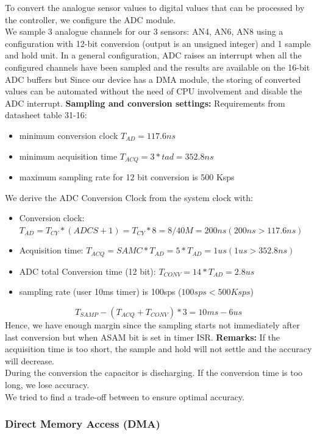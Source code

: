 To convert the analogue sensor values to digital values that can be processed by the controller, we configure the ADC module. \\
We sample 3 analogue channels for our 3 sensors: AN4, AN6, AN8 using a configuration with 12-bit conversion (output is an unsigned integer) and 1 sample and hold unit.
\vskip 0.1in
\noindent
In a general configuration, ADC raises an interrupt when all the configured channels have been sampled and the results are available on the 16-bit ADC buffers but Since our device has a DMA module, the storing of converted values can be automated without the need of CPU involvement and disable the ADC interrupt.
\vskip 0.1in
\noindent
\textbf{Sampling and conversion settings:}
\vskip 0.1in
\noindent
Requirements from datasheet table 31-16:
\begin{itemize}
    \item minimum conversion clock $T_{AD} = 117.6 ns$
    \item minimum acquisition time $T_{ACQ}=3*tad= 352.8ns $
    \item maximum sampling rate for 12 bit conversion is 500 Ksps
\end{itemize}
\vskip 0.1in
\noindent
We derive the ADC Conversion Clock from the system clock with:
\begin{itemize}
    \item Conversion clock: $T_{AD}=T_{CY}*(ADCS+1)= T_{CY}*8 = 8/40M= 200ns (200ns>117.6ns)$
    \item Acquisition time: $T_{ACQ}= SAMC*T_{AD}= 5*T_{AD}=1us (1us>352.8ns)$
    \item ADC total Conversion time (12 bit): $T_{CONV}=14*T_{AD}=2.8us$
    \item sampling rate (user 10ms timer) is 100sps ($100sps < 500Ksps$)
\end{itemize}
$$T_{SAMP}-(T_{ACQ}+T_{CONV})*3=10ms-6us$$
Hence, we have enough margin since the sampling starts not immediately after last conversion but when ASAM bit is set in timer ISR.
\vskip 0.2in
\noindent
\textbf{Remarks:}
\vskip 0.1in
\noindent
If the acquisition time is too short, the sample and hold will not settle and the accuracy will decrease.\\
During the conversion the capacitor is discharging. If the conversion time is too long, we lose accuracy. \\
We tried to find a trade-off between to ensure optimal accuracy.

\subsubsection*{Direct Memory Access (DMA)}


